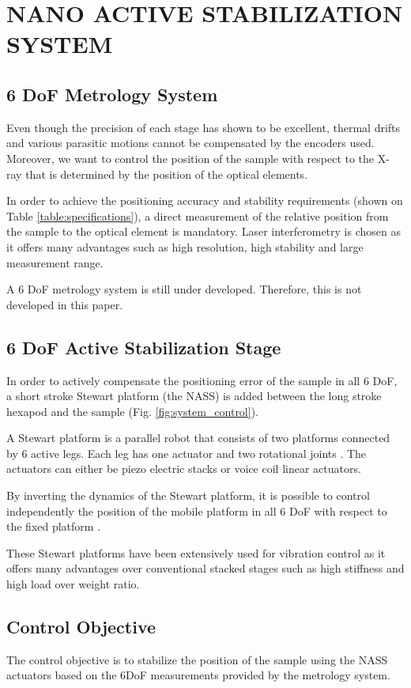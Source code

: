 \documentclass[a4paper, keeplastbox, biblatex]{jacow}
\begin{document}
\section{NANO ACTIVE STABILIZATION SYSTEM}
\label{sec:org7cadf36}
\subsection{6 DoF Metrology System}
\label{sec:org16eceaa}
Even though the precision of each stage has shown to be excellent, thermal drifts and various parasitic motions cannot be compensated by the encoders used.
Moreover, we want to control the position of the sample with respect to the X-ray that is determined by the position of the optical elements.

In order to achieve the positioning accuracy and stability requirements (shown on Table \ref{table:specifications}), a direct measurement of the relative position from the sample to the optical element is mandatory.
Laser interferometry is chosen as it offers many advantages such as high resolution, high stability and large measurement range.

A 6 DoF metrology system is still under developed. Therefore, this is not developed in this paper.

\subsection{6 DoF Active Stabilization Stage}
\label{sec:orge67f457}
In order to actively compensate the positioning error of the sample in all 6 DoF, a short stroke Stewart platform (the NASS) is added between the long stroke hexapod and the sample (Fig. \ref{fig:system_control}).

A Stewart platform is a parallel robot that consists of two platforms connected by 6 active legs. Each leg has one actuator and two rotational joints \cite{McInroy1999a}. The actuators can either be piezo electric stacks or voice coil linear actuators.

By inverting the dynamics of the Stewart platform, it is possible to control independently the position of the mobile platform in all 6 DoF with respect to the fixed platform \cite{McInroy2000}.

These Stewart platforms have been extensively used for vibration control \cite{Geng1992,preumont2007} as it offers many advantages over conventional stacked stages such as high stiffness and high load over weight ratio.

\subsection{Control Objective}
\label{sec:orgf7bd3ce}
The control objective is to stabilize the position of the sample using the NASS actuators based on the 6DoF measurements provided by the metrology system.
\end{document}
